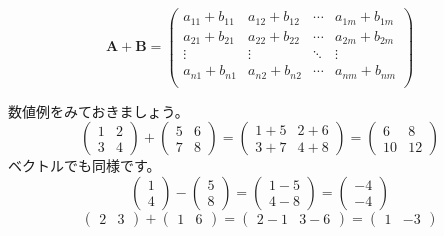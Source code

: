 \documentclass{ltjsbook}
\begin{document}
\begin{equation*}
    \bm{A}+\bm{B} =
    \begin{pmatrix}
        a_{11}+b_{11} & a_{12}+b_{12} & \cdots & a_{1m}+b_{1m} \\
        a_{21}+b_{21} & a_{22}+b_{22} & \cdots & a_{2m}+b_{2m} \\
        \vdots        & \vdots        & \ddots & \vdots        \\
        a_{n1}+b_{n1} & a_{n2}+b_{n2} & \cdots & a_{nm}+b_{nm} \\
    \end{pmatrix}
\end{equation*}

数値例をみておきましょう。
\begin{equation*}
    \begin{pmatrix}
        1 & 2 \\
        3 & 4
    \end{pmatrix}
    +
    \begin{pmatrix}
        5 & 6 \\
        7 & 8
    \end{pmatrix}
    =
    \begin{pmatrix}
        1+5 & 2+6 \\
        3+7 & 4+8
    \end{pmatrix}
    =
    \begin{pmatrix}
        6  & 8  \\
        10 & 12
    \end{pmatrix}
\end{equation*}
ベクトルでも同様です。
\begin{equation*}
    \begin{pmatrix}
        1 \\
        4
    \end{pmatrix}
    -
    \begin{pmatrix}
        5 \\
        8
    \end{pmatrix}
    =
    \begin{pmatrix}
        1-5 \\
        4-8
    \end{pmatrix}
    =
    \begin{pmatrix}
        -4 \\
        -4
    \end{pmatrix}
\end{equation*}
\begin{equation*}
    \begin{pmatrix}
        2 &
        3
    \end{pmatrix}
    +
    \begin{pmatrix}
        1 & 6
    \end{pmatrix}
    =
    \begin{pmatrix}
        2-1 & 3-6
    \end{pmatrix}
    =
    \begin{pmatrix}
        1 & -3
    \end{pmatrix}
\end{equation*}
\end{document}

